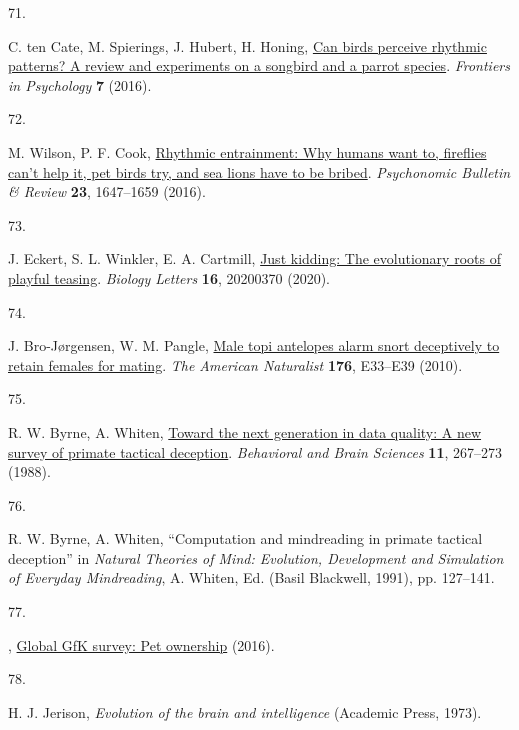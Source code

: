 \documentclass[
  man, donotrepeattitle,floatsintext]{apa6}
\newlength{\cslhangindent}
\newlength{\csllabelwidth}
\newlength{\cslentryspacingunit} %
\newenvironment{CSLReferences}[2] %
 {%
  \setlength{\parindent}{0pt}
  \ifodd #1
  \let\oldpar\par
  \def\par{\hangindent=\cslhangindent\oldpar}
  \fi
  \setlength{\parskip}{#2\cslentryspacingunit}
 }%
 {}
\newcommand{\CSLLeftMargin}[1]{\parbox[t]{\csllabelwidth}{#1}}
\newcommand{\CSLRightInline}[1]{\parbox[t]{\linewidth - \csllabelwidth}{#1}\break}
\begin{document}
\begin{CSLReferences}{0}{0}
\leavevmode{}%
\CSLLeftMargin{71. }%
\CSLRightInline{C. ten Cate, M. Spierings, J. Hubert, H. Honing, \href{https://doi.org/10.3389/fpsyg.2016.00730}{Can birds perceive rhythmic patterns? A review and experiments on a songbird and a parrot species}. \emph{Frontiers in Psychology} \textbf{7} (2016).}

\leavevmode{}%
\CSLLeftMargin{72. }%
\CSLRightInline{M. Wilson, P. F. Cook, \href{https://doi.org/10.3758/s13423-016-1013-x}{Rhythmic entrainment: Why humans want to, fireflies can't help it, pet birds try, and sea lions have to be bribed}. \emph{Psychonomic Bulletin \& Review} \textbf{23}, 1647--1659 (2016).}

\leavevmode{}%
\CSLLeftMargin{73. }%
\CSLRightInline{J. Eckert, S. L. Winkler, E. A. Cartmill, \href{https://doi.org/10.1098/rsbl.2020.0370}{Just kidding: The evolutionary roots of playful teasing}. \emph{Biology Letters} \textbf{16}, 20200370 (2020).}

\leavevmode{}%
\CSLLeftMargin{74. }%
\CSLRightInline{J. Bro-Jørgensen, W. M. Pangle, \href{https://doi.org/10.1086/653078}{Male topi antelopes alarm snort deceptively to retain females for mating}. \emph{The American Naturalist} \textbf{176}, E33--E39 (2010).}

\leavevmode{}%
\CSLLeftMargin{75. }%
\CSLRightInline{R. W. Byrne, A. Whiten, \href{https://doi.org/10.1017/S0140525X00049955}{Toward the next generation in data quality: A new survey of primate tactical deception}. \emph{Behavioral and Brain Sciences} \textbf{11}, 267--273 (1988).}

\leavevmode{}%
\CSLLeftMargin{76. }%
\CSLRightInline{R. W. Byrne, A. Whiten, {``Computation and mindreading in primate tactical deception''} in \emph{Natural Theories of Mind: Evolution, Development and Simulation of Everyday Mindreading}, A. Whiten, Ed. (Basil Blackwell, 1991), pp. 127--141.}

\leavevmode{}%
\CSLLeftMargin{77. }%
\CSLRightInline{, \href{http://www.gfk.com/global-studies/global-studies-pet-ownership}{Global GfK survey: Pet ownership} (2016).}

\leavevmode{}%
\CSLLeftMargin{78. }%
\CSLRightInline{H. J. Jerison, \emph{Evolution of the brain and intelligence} (Academic Press, 1973).}


\end{CSLReferences}
\end{document}
